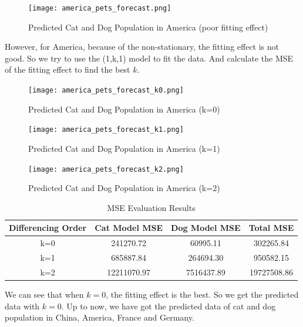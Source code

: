 \documentclass[withoutpreface,bwprint]{cumcmthesis} %
\begin{document}
\clearpage
\begin{figure}[htbp]
	\centering
	\texttt{[image: america\_pets\_forecast.png]}
	\caption{Predicted Cat and Dog Population in America (poor fitting effect)}
\end{figure}
\par However, for America, because of the non-stationary, the fitting effect is not good. 
So we try to use the (1,k,1) model to fit the data.
And calculate the MSE of the fitting effect to find the best \(k\).
\begin{figure}[htbp]
	\centering
	\texttt{[image: america\_pets\_forecast\_k0.png]}
	\caption{Predicted Cat and Dog Population in America (k=0)}
\end{figure}
\clearpage
\begin{figure}[htbp]
	\centering
	\texttt{[image: america\_pets\_forecast\_k1.png]}
	\caption{Predicted Cat and Dog Population in America (k=1)}
\end{figure}
\begin{figure}[htbp]
	\centering
	\texttt{[image: america\_pets\_forecast\_k2.png]}
	\caption{Predicted Cat and Dog Population in America (k=2)}
\end{figure}
\begin{table}[htbp]
\small %
\centering
\caption{MSE Evaluation Results}
\begin{tabular}{cccc}
\toprule
Differencing Order & Cat Model MSE & Dog Model MSE & Total MSE \\
\midrule
k=0 & 241270.72 & 60995.11 & 302265.84 \\
k=1 & 685887.84 & 264694.30 & 950582.15 \\
k=2 & 12211070.97 & 7516437.89 & 19727508.86 \\
\bottomrule
\end{tabular}
\end{table}
\par We can see that when \(k=0\), the fitting effect is the best.
So we get the predicted data with \(k=0\).
Up to now, we have got the predicted data of cat and dog population in China, America, France and Germany.
\end{document}
